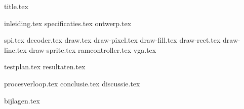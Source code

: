 \documentclass[final]{scrreprt}
\begin{document}

{title.tex}

\newpage

\tableofcontents

\newpage
{}
{inleiding.tex}
{specificaties.tex}
{ontwerp.tex}

{spi.tex}
{decoder.tex}
{draw.tex}
{draw-pixel.tex}
{draw-fill.tex}
{draw-rect.tex}
{draw-line.tex}
{draw-sprite.tex}
{ramcontroller.tex}
{vga.tex}

{testplan.tex}
{resultaten.tex}

{procesverloop.tex}
{conclusie.tex}
{discussie.tex}

\newpage
{}

\printbibliography
{bijlagen.tex}
\end{document}
